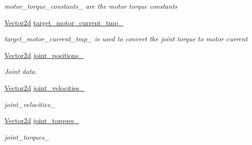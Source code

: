 \begin{DoxyCompactItemize}
\begin{DoxyCompactList}\small\item\em motor\+\_\+torque\+\_\+constants\+\_\+ are the motor torque constants \end{DoxyCompactList}\item 
\mbox{\label{classblmc__robots_1_1Stuggihop_a1ed246c189c92bc9fb87996fabe9dee8}} 
\hyperlink{common__header_8hpp_acb6916bc8c9fe9d98c484fd4cc201447}{Vector2d} \hyperlink{classblmc__robots_1_1Stuggihop_a1ed246c189c92bc9fb87996fabe9dee8}{target\+\_\+motor\+\_\+current\+\_\+tmp\+\_\+}
\begin{DoxyCompactList}\small\item\em target\+\_\+motor\+\_\+current\+\_\+tmp\+\_\+ is used to convert the joint torque to motor current \end{DoxyCompactList}\item 
\hyperlink{common__header_8hpp_acb6916bc8c9fe9d98c484fd4cc201447}{Vector2d} \hyperlink{classblmc__robots_1_1Stuggihop_a9426a6b5b97a1d57a4db4691f0f4eac5}{joint\+\_\+positions\+\_\+}
\begin{DoxyCompactList}\small\item\em Joint data. \end{DoxyCompactList}\item 
\mbox{\label{classblmc__robots_1_1Stuggihop_ad9373f04a92810a1833ea012226d48ba}} 
\hyperlink{common__header_8hpp_acb6916bc8c9fe9d98c484fd4cc201447}{Vector2d} \hyperlink{classblmc__robots_1_1Stuggihop_ad9373f04a92810a1833ea012226d48ba}{joint\+\_\+velocities\+\_\+}
\begin{DoxyCompactList}\small\item\em joint\+\_\+velocities\+\_\+ \end{DoxyCompactList}\item 
\mbox{\label{classblmc__robots_1_1Stuggihop_a414d3559ccc9e7749871860acdad2e82}} 
\hyperlink{common__header_8hpp_acb6916bc8c9fe9d98c484fd4cc201447}{Vector2d} \hyperlink{classblmc__robots_1_1Stuggihop_a414d3559ccc9e7749871860acdad2e82}{joint\+\_\+torques\+\_\+}
\begin{DoxyCompactList}\small\item\em joint\+\_\+torques\+\_\+ \end{DoxyCompactList}\item 
\mbox{\label{classblmc__robots_1_1Stuggihop_a0cc32133b3a6afd375eaee0537adfdfb}} 

\end{DoxyCompactItemize}
